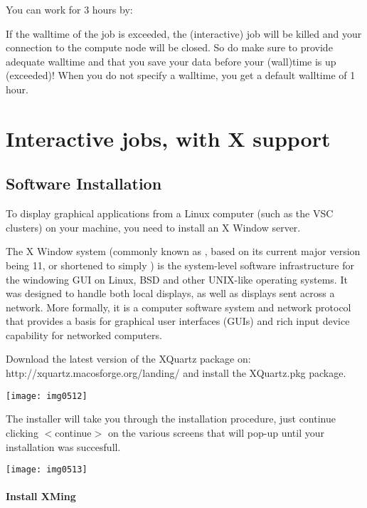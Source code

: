 You can work for 3 hours by:
\begin{prompt}
\end{prompt}

If the walltime of the job is exceeded, the (interactive) job will be killed
and your connection to the compute node will be closed. So do make sure to
provide adequate walltime and that you save your data before your (wall)time is
up (exceeded)!  When you do not specify a walltime, you get a default walltime
of 1 hour.

\section{Interactive jobs, with X support}

\subsection{Software Installation}

To display graphical applications from a Linux computer (such as the VSC
clusters) on your machine, you need to install an X Window server.

The X Window system (commonly known as , based on its current major
version being 11, or shortened to simply ) is the system-level
software infrastructure for the windowing GUI on Linux, BSD and other UNIX-like
operating systems. It was designed to handle both local displays, as well as
displays sent across a network. More formally, it is a computer software system
and network protocol that provides a basis for graphical user interfaces (GUIs)
and rich input device capability for networked computers.

\ifmac
  Download the latest version of the XQuartz package on:
  http://xquartz.macosforge.org/landing/
  and install the XQuartz.pkg package.

  \texttt{[image: img0512]}

  The installer will take you through the installation procedure, just continue
  clicking $<$continue$>$ on the various screens that will pop-up until your
  installation was succesfull.

  \texttt{[image: img0513]}
\fi
\iflinux
\fi

\ifwindows
  \paragraph{Install XMing}

